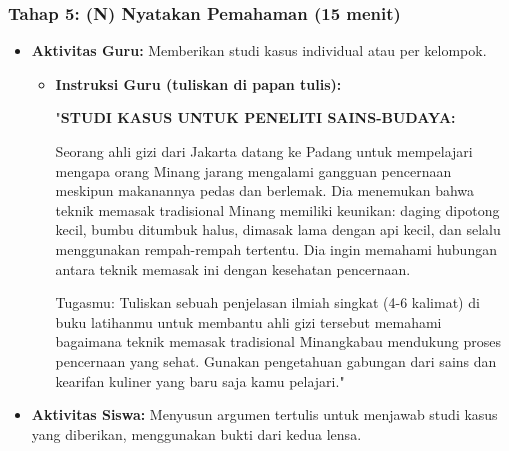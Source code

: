 \documentclass[a4paper,12pt]{article}
\begin{document}
\subsubsection{Tahap 5: (N) Nyatakan Pemahaman (15 menit)}
\begin{itemize}
\item \textbf{Aktivitas Guru:} Memberikan studi kasus individual atau per kelompok.
    \begin{itemize}
    \item \textbf{Instruksi Guru (tuliskan di papan tulis):}
    
    "\textbf{STUDI KASUS UNTUK PENELITI SAINS-BUDAYA:}
    
    Seorang ahli gizi dari Jakarta datang ke Padang untuk mempelajari mengapa orang Minang jarang mengalami gangguan pencernaan meskipun makanannya pedas dan berlemak. Dia menemukan bahwa teknik memasak tradisional Minang memiliki keunikan: daging dipotong kecil, bumbu ditumbuk halus, dimasak lama dengan api kecil, dan selalu menggunakan rempah-rempah tertentu. Dia ingin memahami hubungan antara teknik memasak ini dengan kesehatan pencernaan.
    
    Tugasmu: Tuliskan sebuah penjelasan ilmiah singkat (4-6 kalimat) di buku latihanmu untuk membantu ahli gizi tersebut memahami bagaimana teknik memasak tradisional Minangkabau mendukung proses pencernaan yang sehat. Gunakan pengetahuan gabungan dari sains dan kearifan kuliner yang baru saja kamu pelajari."
    \end{itemize}
\item \textbf{Aktivitas Siswa:} Menyusun argumen tertulis untuk menjawab studi kasus yang diberikan, menggunakan bukti dari kedua lensa.
\end{itemize}
\end{document}
